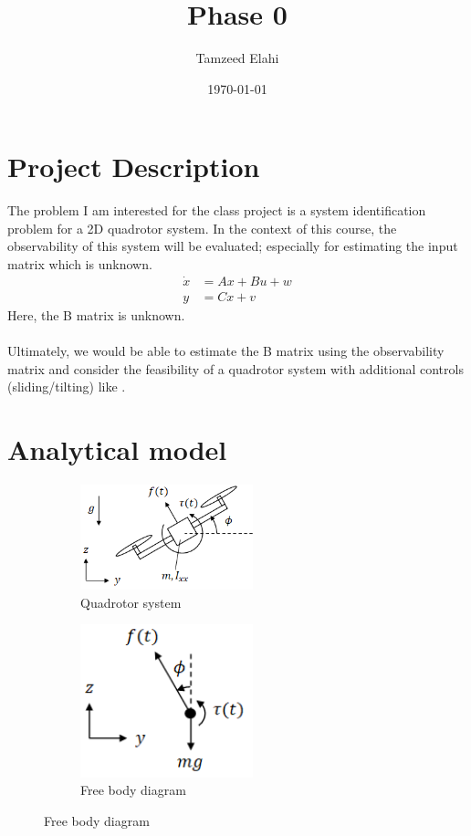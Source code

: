 \documentclass[12pt]{article}
\title{Phase 0}
\author{Tamzeed Elahi}
\date{\today}
\begin{document}
\maketitle

\section*{Project Description}
The problem I am interested for the class project is a system identification problem for a 2D quadrotor system. In the context of this course, the observability of this system will be evaluated; especially for estimating the input matrix which is unknown. 
\begin{align*}
    \dot{x} &= Ax + Bu + w \\
    y &= Cx + v
\end{align*} 
Here, the B matrix is unknown. \\\\
Ultimately, we would be able to estimate the B matrix using the observability matrix and consider the feasibility of a quadrotor system with additional controls (sliding/tilting) like \cite{Nemati2014}. 
\section*{Analytical model}
\begin{figure}[h!]
    \begin{subfigure}[t]{0.5\textwidth}
        \centering
        \includegraphics[width=5cm]{figures/model_diagram.png}
        \caption{Quadrotor system \cite{model_diagram}}
        \label{fig:01}
    \end{subfigure}
    \hfill
    \begin{subfigure}[t]{0.5\textwidth}
        \centering
        \includegraphics[width=5cm]{figures/free_body_diagram.png}
        \caption{Free body diagram \cite{model_diagram}}
        \label{fig:02}
    \end{subfigure}
\end{figure}
\end{document}
